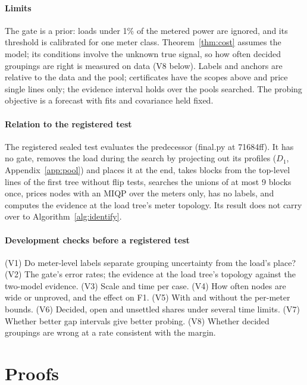\documentclass[journal,onecolumn,11pt]{IEEEtran}
\begin{document}
\paragraph*{Limits} The gate is a prior: loads under 1\% of the metered power are ignored, and its threshold is calibrated for
one meter class. Theorem~\ref{thm:cost} assumes the model; its conditions involve the unknown true signal, so how often
decided groupings are right is measured on data (V8 below).
Labels and anchors are relative to the data and the pool; certificates have the scopes above and price single lines only;
the evidence interval holds over the pools searched. The probing objective is a forecast with fits and covariance held
fixed.

\paragraph*{Relation to the registered test} The registered sealed test evaluates the predecessor (final.py at 71684ff). It
has no gate, removes the load during the search by projecting out its profiles ($D_1$, Appendix~\ref{app:pool}) and places it at the end, takes blocks from the top-level
lines of the first tree without flip tests, searches the unions of at most 9 blocks once, prices nodes with an MIQP over the
meters only, has no labels, and computes the evidence at the load tree's meter topology. Its result does not carry over to
Algorithm~\ref{alg:identify}.

\paragraph*{Development checks before a registered test} (V1) Do meter-level labels separate grouping uncertainty from the
load's place? (V2) The gate's error rates; the evidence at the load tree's topology against the two-model evidence. (V3) Scale
and time per case. (V4) How often nodes are wide or unproved, and the effect on F1. (V5) With and without the per-meter
bounds. (V6) Decided, open and unsettled shares under several time limits. (V7) Whether better gap intervals give better
probing. (V8) Whether decided groupings are wrong at a rate consistent with the margin.

\appendices
\section{Proofs}
\end{document}
